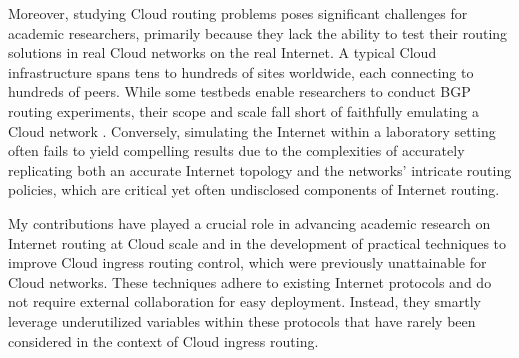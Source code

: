 \documentclass[sigconf,nonacm,screen,letterpaper,10pt]{acmart}
\begin{document}
Moreover, studying Cloud routing problems poses significant challenges
for academic researchers, primarily because they lack the ability to
test their routing solutions in real Cloud networks on the real
Internet. A typical Cloud infrastructure spans tens to hundreds of sites
worldwide, each connecting to hundreds of peers. While some testbeds
enable researchers to conduct BGP routing experiments, their scope and
scale fall short of faithfully emulating a Cloud network
\cite{tangled, schlinker19peering}. Conversely, simulating the Internet
within a laboratory setting often fails to yield compelling results due
to the complexities of accurately replicating both an accurate Internet
topology and the networks' intricate routing policies, which are
critical yet often undisclosed components of Internet routing.

My contributions have played a crucial role in advancing academic
research on Internet routing at Cloud scale and in the development of
practical techniques to improve Cloud ingress routing control, which
were previously unattainable for Cloud networks. These techniques adhere
to existing Internet protocols and do not require external collaboration
for easy deployment. Instead, they smartly leverage underutilized
variables within these protocols that have rarely been considered in the
context of Cloud ingress routing.
\end{document}
